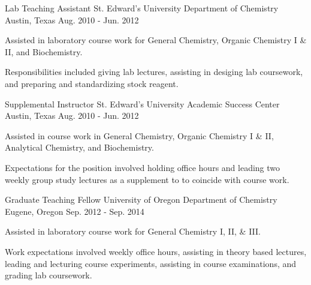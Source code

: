 

\begin{cventries}
  \cventry
    {Lab Teaching Assistant}
    {St. Edward's University Department of Chemistry}
    {Austin, Texas}
    {Aug. 2010 - Jun. 2012}
    {
      \begin{cvitems}
        \item{Assisted in laboratory course work for General Chemistry, Organic Chemistry I \& II, and Biochemistry.}
        \item{Responsibilities included giving lab lectures, assisting in desiging lab coursework, and preparing and standardizing stock reagent.}
      \end{cvitems}
    }

  \cventry
    {Supplemental Instructor}
    {St. Edward's University Academic Success Center}
    {Austin, Texas}
    {Aug. 2010 - Jun. 2012}
    {
      \begin{cvitems}
        \item{Assisted in course work in General Chemistry, Organic Chemistry I \& II, Analytical Chemistry, and Biochemistry.}
        \item{Expectations for the position involved holding office hours and leading two weekly group study lectures as a supplement to to coincide with course work.}
      \end{cvitems}
    }

  \cventry
    {Graduate Teaching Fellow}
    {University of Oregon Department of Chemistry}
    {Eugene, Oregon}
    {Sep. 2012 - Sep. 2014}
    {
      \begin{cvitems}
        \item{Assisted in laboratory course work for General Chemistry I, II, \& III.}
        \item{Work expectations involved weekly office hours, assisting in theory based lectures, leading and lecturing course experiments, assisting in course examinations, and grading lab coursework.}
      \end{cvitems}
    }


\end{cventries}
